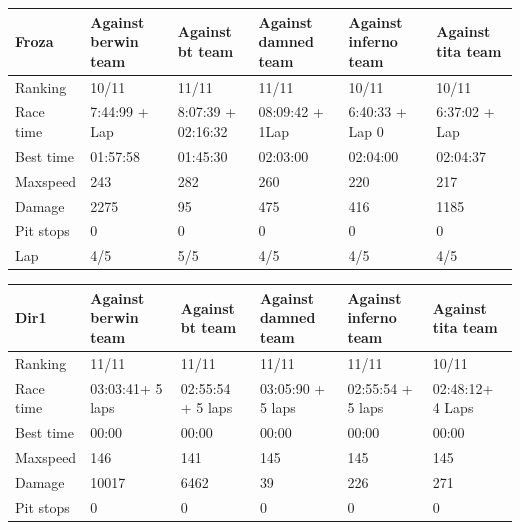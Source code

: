 \documentclass{llncs}
\begin{document}
\begin{table}[h!]
	\begin{tabular}{ |p{3cm}|p{2cm}|p{2cm}|p{2 cm}|p{2 cm}|p{2 cm}|}
		\hline
		{ \color{blue}\textbf{Froza} }&
		{ \color{red}\textbf{Against berwin team }}&  
		{ \color{red} \textbf{Against bt team} } &
		{ \color{red} \textbf{Against damned team} } &
		{ \color{red} \textbf{Against inferno team} }&
		{ \color{red} \textbf{Against tita team} }
		\\
		\hline
		Ranking & 10/11  & 11/11 & 11/11 & 10/11& 10/11
		\\
		\hline
		Race time & 7:44:99 + Lap & 8:07:39 + 02:16:32 & 08:09:42 + 1Lap & 6:40:33 + Lap 0 &  6:37:02 + Lap 
		\\
		\hline
		Best time & 01:57:58 & 01:45:30 & 02:03:00 & 02:04:00& 02:04:37
		\\
		\hline 
		Maxspeed & 243  & 282 & 260 & 220& 217
		\\
		\hline
		
		Damage & 2275 & 95 & 475 & 416 & 1185
		\\
		\hline 
		
		
		Pit stops & 0 & 0 & 0 & 0 & 0
		\\
		\hline 
		Lap & 4/5 & 5/5  & 4/5 & 4/5& 4/5 
		\\
		\hline	
	\end{tabular} 
	
	
	\begin{tabular}{ |p{3cm}|p{2cm}|p{2cm}|p{2 cm}|p{2 cm}|p{2 cm}|}
		\hline
		{ \color{blue}\textbf{Dir1} }&
		{ \color{red}\textbf{Against berwin team }}&  
		{ \color{red} \textbf{Against bt team} } &
		{ \color{red} \textbf{Against damned team} } &
		{ \color{red} \textbf{Against inferno team} }&
		{ \color{red} \textbf{Against tita team} }
		\\
		\hline
		Ranking  & 11/11 & 11/11 & 11/11 & 11/11& 10/11
		\\
		\hline
		Race time & 03:03:41+ 5 laps & 02:55:54 + 5 laps & 03:05:90 + 5 laps & 02:55:54 + 5 laps & 02:48:12+ 4 Laps
		\\
		\hline
		Best time & 00:00  & 00:00 & 00:00 & 00:00 & 00:00
		\\
		\hline 
		Maxspeed & 146 & 141 & 145 & 145 & 145
		\\
		\hline
		
		Damage & 10017 & 6462 & 39 & 226& 271
		\\
		\hline 
		
		
		Pit stops & 0 & 0 & 0 & 0 & 0					\\
		\hline 	
	\end{tabular} 
	
\end{table}
\end{document}
